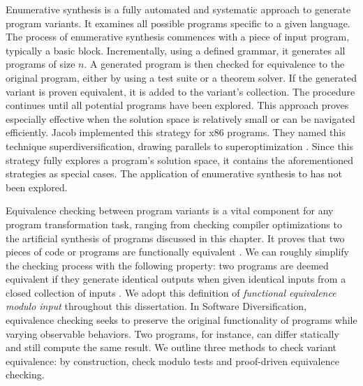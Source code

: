 \begin{strategy}
    \label{enumerative_synthesis}
    Enumerative synthesis is a fully automated and systematic approach to generate program variants.
    It examines all possible programs specific to a given language.
    The process of enumerative synthesis commences with a piece of input program, typically a basic block.
    Incrementally, using a defined grammar, it generates all programs of size $n$.
    A generated program is then checked for equivalence to the original program, either by using a test suite or a theorem solver.
    If the generated variant is proven equivalent, it is added to the variant's collection.
    The procedure continues until all potential programs have been explored.
    This approach proves especially effective when the solution space is relatively small or can be navigated efficiently.
    Jacob \etal \cite{jacob2008superdiversifier} implemented this strategy for x86 programs.
    They named this technique superdiversification, drawing parallels to superoptimization \cite{Massalin1987}.
    Since this strategy fully explores a program's solution space, it contains the aforementioned strategies as special cases.
    The application of enumerative synthesis to \Wasm has not been explored. 
\end{strategy}


\label{equivalence:checking}


Equivalence checking between program variants is a vital component for any program transformation task, ranging from checking compiler optimizations \cite{LeCompilers} to the artificial synthesis of programs discussed in this chapter. 
It proves that two pieces of code or programs are functionally equivalent \cite{churchill2019}. 
We can roughly simplify the checking process with the following property: 
two programs are deemed equivalent if they generate identical outputs when given identical inputs from a closed collection of inputs \cite{10.1145/2814270.2814319}.
We adopt this definition of \emph{functional equivalence modulo input} throughout this dissertation. 
In Software Diversification, equivalence checking seeks to preserve the original functionality of programs while varying observable behaviors. 
Two programs, for instance, can differ statically and still compute the same result. 
We outline three methods to check variant equivalence: by construction, check modulo tests and proof-driven equivalence checking.


